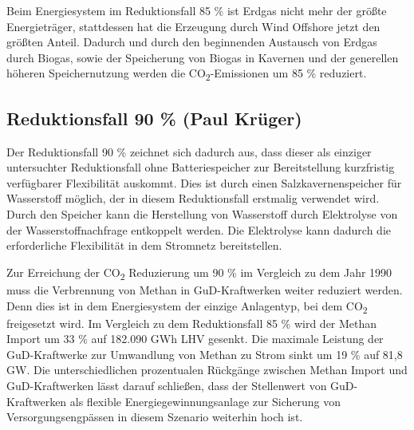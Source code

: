 Beim Energiesystem im Reduktionsfall 85 \% ist Erdgas nicht mehr der größte Energieträger, stattdessen hat die Erzeugung durch Wind Offshore jetzt den größten Anteil.
Dadurch und durch den beginnenden Austausch von Erdgas durch Biogas, sowie der Speicherung von Biogas in Kavernen und der generellen höheren Speichernutzung werden die CO\textsubscript{2}-Emissionen um 85 \% reduziert.

\newpage
\subsection{Reduktionsfall 90 \% (Paul Krüger)}
Der Reduktionsfall 90 \% zeichnet sich dadurch aus, dass dieser als einziger untersuchter Reduktionsfall ohne Batteriespeicher zur Bereitstellung kurzfristig verfüg\-barer Flexibilität auskommt. Dies ist durch einen Salzkavernenspeicher für Wasserstoff möglich, der in diesem Reduktionsfall erstmalig verwendet wird. Durch den Speicher kann die Herstellung von Wasserstoff durch Elektrolyse von der Wasserstoffnachfrage entkoppelt werden. Die Elektrolyse kann dadurch die erforderliche Flexibilität in dem Stromnetz bereitstellen.

Zur Erreichung der CO\textsubscript{2} Reduzierung um 90 \% im Vergleich zu dem Jahr 1990 muss die Verbrennung von Methan in GuD-Kraftwerken weiter reduziert werden. Denn dies ist in dem Energiesystem der einzige Anlagentyp, bei dem CO\textsubscript{2} freigesetzt wird. Im Vergleich zu dem Reduktionsfall 85 \% wird der Methan Import um 33 \% auf 182.090 GWh LHV gesenkt. Die maximale Leistung der GuD-Kraftwerke zur Umwandlung von Methan zu Strom sinkt um 19 \% auf 81,8 GW. Die unterschiedlichen prozentualen Rückgänge zwischen Methan Import und GuD-Kraftwerken lässt darauf schließen, dass der Stellenwert von GuD-Kraftwerken als flexible Energiegewinnungsanlage zur Sicherung von Versorgungsengpässen in diesem Szenario weiterhin hoch ist.

